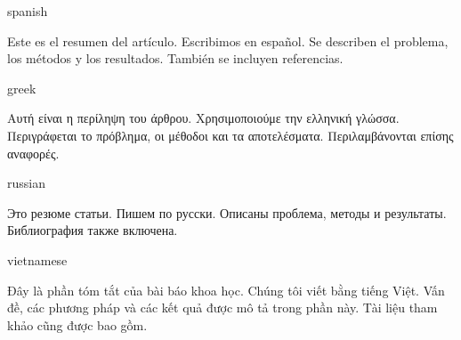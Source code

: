\documentclass[grid,balance,upint,subscriptcorrection,varvw,mathalfa=cal=euler,spanish,french,greek,russian,vietnamese,colorlinks]{asmeconf}
\begin{document}
\begin{selectlanguage}{spanish}%
\begin{abstract*}
Este es el resumen del artículo. Escribimos en español. Se describen el problema, los métodos y los resultados. También se incluyen referencias.
\end{abstract*}
\end{selectlanguage}%


\ifpdftex
    \begin{selectlanguage}{greek}%
    \begin{abstract*}
    Αυτή είναι η περίληψη του άρθρου. Χρησιμοποιούμε την ελληνική γλώσσα. Περιγράφεται το πρόβλημα, οι μέθοδοι και τα αποτελέσματα. Περιλαμβάνονται επίσης αναφορές.
    \end{abstract*}
    \end{selectlanguage}%
    
    \begin{selectlanguage}{russian}
    \begin{abstract*}
    Это резюме статьи. Пишем по русски. Описаны проблема, методы и результаты. Библиография также включена.%
    \end{abstract*}
    \end{selectlanguage}%
    
    \begin{selectlanguage}{vietnamese}
    \begin{abstract*}
    Đây là phần tóm tắt của bài báo khoa học. Chúng tôi viết bằng tiếng Việt. Vấn đề, các phương pháp và các kết quả được mô tả trong phần này. Tài liệu tham khảo cũng được bao gồm.
    \end{abstract*}
    \end{selectlanguage}%
\fi
   
\end{document}
